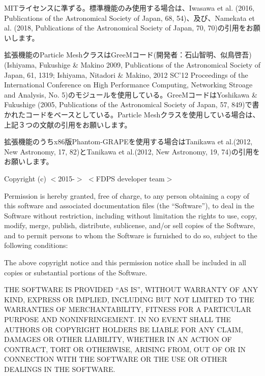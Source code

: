 MITライセンスに準ずる。標準機能のみ使用する場合は、Iwasawa et al. (2016, Publications of the Astronomical Society of Japan, 68, 54)、及び、Namekata et al. (2018, Publications of the Astronomical Society of Japan, 70, 70)の引用をお願いします。

拡張機能のParticle MeshクラスはGreeMコード(開発者：石山智明、似鳥啓吾) (Ishiyama, Fukushige \& Makino 2009, Publications of the Astronomical Society of Japan, 61, 1319; Ishiyama, Nitadori \& Makino, 2012 SC'12 Proceedings of the International Conference on High Performance Computing, Networking Stroage and Analysis, No. 5)のモジュールを使用している。GreeMコードはYoshikawa \& Fukushige (2005, Publications of the Astronomical Society of Japan, 57, 849)で書かれたコードをベースとしている。Particle Meshクラスを使用している場合は、上記３つの文献の引用をお願いします。

拡張機能のうちx86版Phantom-GRAPEを使用する場合はTanikawa et al.(2012, New Astronomy, 17, 82)とTanikawa et al.(2012, New Astronomy, 19, 74)の引用をお願いします。

\vspace{5mm}

Copyright (c) $<$2015-$>$ $<$FDPS developer team$>$

\vspace{3mm}

Permission is hereby granted, free of charge, to any person obtaining a copy of this software and associated documentation files (the ``Software''), to deal in the Software without restriction, including without limitation the rights to use, copy, modify, merge, publish, distribute, sublicense, and/or sell copies of the Software, and to permit persons to whom the Software is furnished to do so, subject to the following conditions:

\vspace{3mm}

The above copyright notice and this permission notice shall be
included in all copies or substantial portions of the Software.

\vspace{3mm}

THE SOFTWARE IS PROVIDED ``AS IS'', WITHOUT WARRANTY OF ANY KIND, EXPRESS OR IMPLIED, INCLUDING BUT NOT LIMITED TO THE WARRANTIES OF MERCHANTABILITY, FITNESS FOR A PARTICULAR PURPOSE AND NONINFRINGEMENT. IN NO EVENT SHALL THE AUTHORS OR COPYRIGHT HOLDERS BE LIABLE FOR ANY CLAIM, DAMAGES OR OTHER LIABILITY, WHETHER IN AN ACTION OF CONTRACT, TORT OR OTHERWISE, ARISING FROM, OUT OF OR IN CONNECTION WITH THE SOFTWARE OR THE USE OR OTHER DEALINGS IN THE SOFTWARE.
